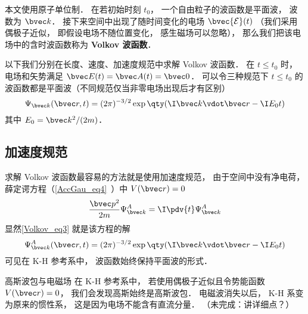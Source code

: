 
\begin{issues}
\issueTODO
\end{issues}


本文使用原子单位制． 在若初始时刻 $t_0$， 一个自由粒子的波函数是平面波， 波数为 $\bvec k$． 接下来空间中出现了随时间变化的电场 $\bvec {\mathcal E}(t)$ （我们采用偶极子近似， 即假设电场不随位置变化， 感生磁场可以忽略）， 那么我们把该电场中的含时波函数称为 \textbf{Volkov 波函数}．

以下我们分别在长度、速度、加速度规范中求解 Volkov 波函数． 在 $t \le t_0$ 时， 电场和矢势满足 $\bvec E(t) = \bvec A(t) = \bvec 0$． 可以令三种规范下 $t \le t_0$ 的波函数都是平面波（不同规范仅当非零电场出现后才有区别）
\begin{equation}\label{Volkov_eq3}
\Psi_{\bvec k}(\bvec r, t) = (2\pi)^{-3/2} \exp\qty(\I\bvec k \vdot \bvec r - \I E_0 t)
\end{equation}
其中 $E_0 = \bvec k^2/(2m)$．

\subsection{加速度规范}
求解 Volkov 波函数最容易的方法就是使用加速度规范， 由于空间中没有净电荷， 薛定谔方程（\autoref{AccGau_eq4}~）中 $V(\bvec r) = 0$
\begin{equation}
\frac{\bvec p^2}{2m}\Psi_{\bvec k}^A = \I \pdv{t} \Psi_{\bvec k}^A
\end{equation}
显然\autoref{Volkov_eq3} 就是该方程的解
\begin{equation}\label{Volkov_eq2}
\Psi_{\bvec k}^A(\bvec r, t) = (2\pi)^{-3/2} \exp\qty(\I\bvec k \vdot \bvec r - \I E_0 t)
\end{equation}
可见在 K-H 参考系中， 波函数始终保持平面波的形式．

\begin{example}{高斯波包与电磁场}
在 K-H 参考系中， 若使用偶极子近似且令势能函数 $V(\bvec r) = 0$， 我们会发现高斯始终是高斯波包． 电磁波消失以后， K-H 系变为原来的惯性系， 这是因为电场不能含有直流分量． （未完成：讲详细点？）
\end{example}


